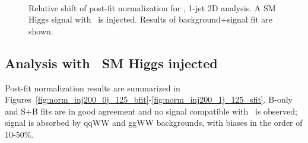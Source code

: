 \begin{figure}[!hbtp]
{}
\\
\caption{Relative shift of post-fit normalization for  \GeV, 1-jet 2D analysis.
A SM Higgs signal with  \GeV\ is injected. Results of background+signal fit are shown.}
\label{fig:norm_inj125_1j_125_sfit}
\end{figure}

\clearpage

\subsection{Analysis with  \GeV\ SM Higgs injected}

Post-fit normalization results are summarized in Figures~\ref{fig:norm_inj200_0j_125_bfit}-\ref{fig:norm_inj200_1j_125_sfit}.
B-only and S+B fits are in good agreement and no signal compatible with  \GeV\ is observed; 
signal is absorbed by qqWW and ggWW backgrounds, with biases in the order of 10-50\%.

